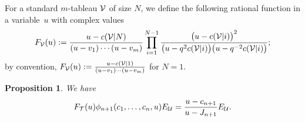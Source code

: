 \documentclass[pdftex]{sigma}
\newtheorem{Proposition}[Theorem]{Proposition}
\begin{document}
For a standard $m$-tableau ${\cal{V}}$ of size $N$, we def\/ine
the following rational function in a variab\-le~$u$ with complex values
\begin{gather}\label{def-F1}
F_{{\cal{V}}}(u):=\frac{u-c({\cal{V}}|N)}{(u-v_1)\cdots(u-v_m)}\prod_{i=1}^{N-1}\frac{\bigl(u-c({\cal{V}}|i)\bigr)^2}
{\bigl(u-q^2c({\cal{V}}|i)\bigr)\bigl(u-q^{-2}c({\cal{V}}|i)\bigr)} ;
\end{gather}
by convention,
$F_{{\cal{V}}}(u):= \frac{u-c({\cal{V}}|1)}{(u-v_1)\cdots(u-v_m)} $
for $N=1$.

\begin{Proposition} \label{prop-idem11}
We have
\begin{gather}\label{eq-idem11}
F_{{\cal{T}}}(u)\phi_{n+1}(c_1,\dots,c_n,u)E_{{\cal{U}}}=\frac{u-c_{n+1}}{u-J_{n+1}}  E_{{\cal{U}}}.
\end{gather}
\end{Proposition}
\end{document}
